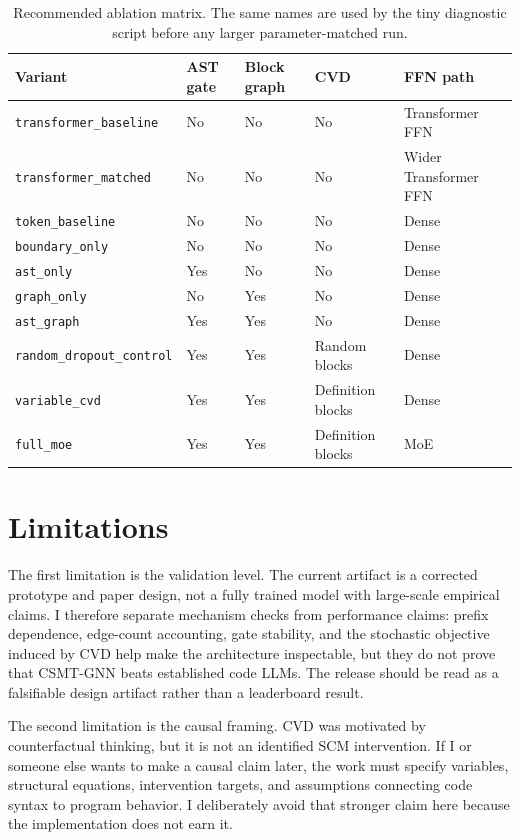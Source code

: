 \documentclass[10pt]{article}
\begin{document}
\begin{table}[t]
  \centering
  \caption{Recommended ablation matrix.  The same names are used by the tiny
  diagnostic script before any larger parameter-matched run.}
  \label{tab:ablations}
  \begin{tabular}{lllll}
    \toprule
    Variant & AST gate & Block graph & CVD & FFN path \\
    \midrule
    \texttt{transformer\_baseline} & No & No & No & Transformer FFN \\
    \texttt{transformer\_matched} & No & No & No & Wider Transformer FFN \\
    \texttt{token\_baseline} & No & No & No & Dense \\
    \texttt{boundary\_only} & No & No & No & Dense \\
    \texttt{ast\_only} & Yes & No & No & Dense \\
    \texttt{graph\_only} & No & Yes & No & Dense \\
    \texttt{ast\_graph} & Yes & Yes & No & Dense \\
    \texttt{random\_dropout\_control} & Yes & Yes & Random blocks & Dense \\
    \texttt{variable\_cvd} & Yes & Yes & Definition blocks & Dense \\
    \texttt{full\_moe} & Yes & Yes & Definition blocks & MoE \\
    \bottomrule
  \end{tabular}
\end{table}

\section{Limitations}

The first limitation is the validation level.  The current artifact is a
corrected prototype and paper design, not a fully trained model with large-scale
empirical claims.  I therefore separate mechanism checks from performance
claims: prefix dependence, edge-count accounting, gate stability, and the
stochastic objective induced by CVD help make the architecture inspectable, but
they do not prove that CSMT-GNN beats established code LLMs.  The release should
be read as a falsifiable design artifact rather than a leaderboard result.

The second limitation is the causal framing.  CVD was motivated by
counterfactual thinking, but it is not an identified SCM intervention.  If I or
someone else wants to make a causal claim later, the work must specify variables,
structural equations, intervention targets, and assumptions connecting code
syntax to program behavior.  I deliberately avoid that stronger claim here
because the implementation does not earn it.
\end{document}
